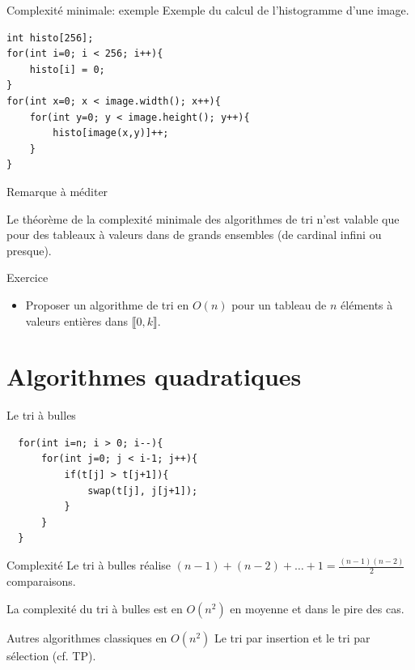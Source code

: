 \begin{frame}[fragile]{Complexité minimale: exemple}
  Exemple du calcul de l'histogramme d'une image.
 \begin{verbatim}
int histo[256];
for(int i=0; i < 256; i++){
    histo[i] = 0;
}
for(int x=0; x < image.width(); x++){
    for(int y=0; y < image.height(); y++){
        histo[image(x,y)]++;
    }
}
\end{verbatim}
\end{frame}

\begin{frame}{Remarque à méditer}

Le théorème de la complexité minimale des algorithmes de tri n'est valable que pour des tableaux à valeurs dans de grands ensembles (de cardinal infini ou presque).

\begin{exampleblock}{Exercice}
	\begin{itemize}
		\item Proposer un algorithme de tri en $O(n)$ pour un tableau de $n$ éléments à valeurs entières dans $\llbracket 0, k\rrbracket$.
	\end{itemize}
\end{exampleblock}

\end{frame}

\section{Algorithmes quadratiques}

\begin{frame}[fragile]{Le tri à bulles}
  \begin{verbatim}
  for(int i=n; i > 0; i--){
      for(int j=0; j < i-1; j++){
          if(t[j] > t[j+1]){
              swap(t[j], j[j+1]);
          }
      }
  }
  \end{verbatim}
  \begin{block}{Complexité}
    Le tri à bulles réalise $(n-1) + (n-2) + \hdots + 1  = \frac{(n-1)(n-2)}{2}$ comparaisons.

    La complexité du tri à bulles est en $O(n^2)$ en moyenne et dans le pire des cas.
  \end{block}
  
  \begin{exampleblock}{Autres algorithmes classiques en $O(n^2)$}
  Le tri par insertion et le tri par sélection (cf. TP).
  \end{exampleblock}
\end{frame}

